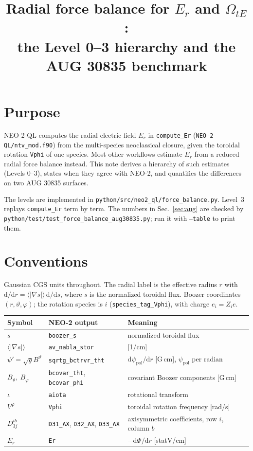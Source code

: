 \documentclass[11pt]{article}
\title{Radial force balance for $E_r$ and $\Omega_{tE}$:\\
the Level 0--3 hierarchy and the AUG 30835 benchmark}
\date{}
\newcommand{\rd}{\mathrm{d}}
\newcommand{\tht}{\vartheta}
\newcommand{\ph}{\varphi}
\newcommand{\code}[1]{\texttt{#1}}
\begin{document}
\maketitle
\sloppy

\section{Purpose}

NEO-2-QL computes the radial electric field $E_r$ in \code{compute\_Er}
(\code{NEO-2-QL/ntv\_mod.f90}) from the multi-species neoclassical closure,
given the toroidal rotation \code{Vphi} of one species.  Most other
workflows estimate $E_r$ from a reduced radial force balance instead.  This
note derives a hierarchy of such estimates (Levels 0--3), states when they
agree with NEO-2, and quantifies the differences on two AUG 30835 surfaces.

The levels are implemented in \code{python/src/neo2\_ql/force\_balance.py}.
Level~3 replays \code{compute\_Er} term by term.  The numbers in
Sec.~\ref{sec:aug} are checked by
\code{python/test/test\_force\_balance\_aug30835.py}; run it with
\code{--table} to print them.

\section{Conventions}

Gaussian CGS units throughout.  The radial label is the effective radius
$r$ with $\rd/\rd r = \langle|\nabla s|\rangle\,\rd/\rd s$, where $s$ is the
normalized toroidal flux.  Boozer coordinates $(r,\tht,\ph)$; the rotation
species is $i$ (\code{species\_tag\_Vphi}), with charge $e_i = Z_i e$.

\begin{center}
\begin{tabular}{lll}
  \toprule
  Symbol & NEO-2 output & Meaning \\
  \midrule
  $s$ & \code{boozer\_s} & normalized toroidal flux \\
  $\langle|\nabla s|\rangle$ & \code{av\_nabla\_stor} & [1/cm] \\
  $\psi' = \sqrt{g}B^\tht$ & \code{sqrtg\_bctrvr\_tht} &
    $\rd\psi_\mathrm{pol}/\rd r$ [G\,cm], $\psi_\mathrm{pol}$ per radian \\
  $B_\tht,\ B_\ph$ & \code{bcovar\_tht}, \code{bcovar\_phi} &
    covariant Boozer components [G\,cm] \\
  $\iota$ & \code{aiota} & rotational transform \\
  $V^\ph$ & \code{Vphi} & toroidal rotation frequency [rad/s] \\
  $D_{3j}^{ib}$ & \code{D31\_AX}, \code{D32\_AX}, \code{D33\_AX} &
    axisymmetric coefficients, row $i$, column $b$ \\
  $E_r$ & \code{Er} & $-\rd\Phi/\rd r$ [statV/cm] \\
  \bottomrule
\end{tabular}
\end{center}
\end{document}
